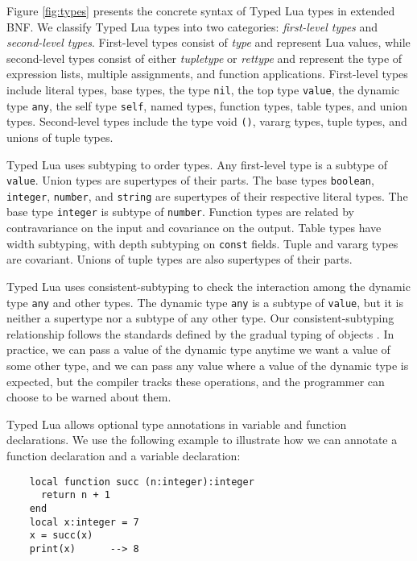 Figure \ref{fig:types} presents the concrete syntax of
Typed Lua types in extended BNF.
We classify Typed Lua types into two categories:
\emph{first-level types} and \emph{second-level types}.
First-level types consist of \emph{type} and represent Lua values,
while second-level types consist of either \emph{tupletype} or
\emph{rettype} and represent the type of expression lists,
multiple assignments, and function applications.
First-level types include literal types, base types, the type \texttt{nil},
the top type \texttt{value}, the dynamic type \texttt{any},
the self type \texttt{self}, named types, function types, table types,
and union types.
Second-level types include the type void \texttt{()},
vararg types, tuple types, and unions of tuple types.

Typed Lua uses subtyping to order types.
Any first-level type is a subtype of \texttt{value}.
Union types are supertypes of their parts.
The base types \texttt{boolean}, \texttt{integer}, \texttt{number},
and \texttt{string} are supertypes of their respective literal types.
The base type \texttt{integer} is subtype of \texttt{number}.
Function types are related by contravariance on the input
and covariance on the output.
Table types have width subtyping, with depth subtyping on
\texttt{const} fields.
Tuple and vararg types are covariant.
Unions of tuple types are also supertypes of their parts.

Typed Lua uses consistent-subtyping to check the interaction among the
dynamic type \texttt{any} and other types.
The dynamic type \texttt{any} is a subtype of \texttt{value}, but it is
neither a supertype nor a subtype of any other type.
Our consistent-subtyping relationship follows the standards defined
by the gradual typing of objects \citep{siek2007objects,siek2013mutable}.
In practice, we can pass a value of the dynamic type anytime we want
a value of some other type, and we can pass any value where a
value of the dynamic type is expected, but the compiler tracks these
operations, and the programmer can choose to be warned about them.

Typed Lua allows optional type annotations in variable and function
declarations.
We use the following example to illustrate how we can annotate a
function declaration and a variable declaration:
\begin{verbatim}
    local function succ (n:integer):integer
      return n + 1
    end
    local x:integer = 7
    x = succ(x)
    print(x)      --> 8
\end{verbatim}

